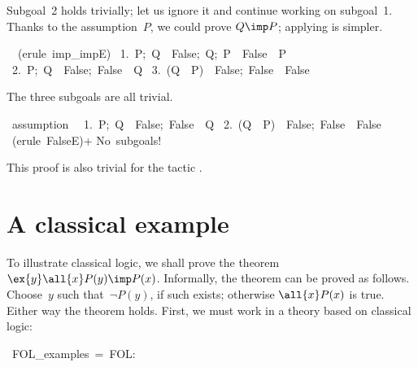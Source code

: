 Subgoal~2 holds trivially; let us ignore it and continue working on
subgoal~1.  Thanks to the assumption~$P$, we could prove $Q\imp P$;
applying  is simpler.
\begin{isabelle}
\ \ (erule\ imp\_impE)\isanewline
\ 1.\ \isasymlbrakk P;\ Q\ \isasymlongrightarrow \ False;\ Q;\ P\ \isasymlongrightarrow \ False\isasymrbrakk \ \isasymLongrightarrow \ P\isanewline
\ 2.\ \isasymlbrakk P;\ Q\ \isasymlongrightarrow \ False;\ False\isasymrbrakk \ \isasymLongrightarrow \ Q\isanewline
\ 3.\ \isasymlbrakk (Q\ \isasymlongrightarrow \ P)\ \isasymlongrightarrow \ False;\ False\isasymrbrakk \ \isasymLongrightarrow \ False%
\end{isabelle}
The three subgoals are all trivial.
\begin{isabelle}
\ assumption\ \isanewline
\ 1.\ \isasymlbrakk P;\ Q\ \isasymlongrightarrow \ False;\
False\isasymrbrakk \ \isasymLongrightarrow \ Q\isanewline
\ 2.\ \isasymlbrakk (Q\ \isasymlongrightarrow \ P)\
\isasymlongrightarrow \ False;\ False\isasymrbrakk \
\isasymLongrightarrow \ False%
\isanewline
\isacommand{apply}\ (erule\ FalseE)+\isanewline
No\ subgoals!\isanewline
{}
\end{isabelle}
This proof is also trivial for the \ML{} tactic .


\section{A classical example} \label{fol-cla-example}
To illustrate classical logic, we shall prove the theorem
$\ex{y}\all{x}P(y)\imp P(x)$.  Informally, the theorem can be proved as
follows.  Choose~$y$ such that~$\neg P(y)$, if such exists; otherwise
$\all{x}P(x)$ is true.  Either way the theorem holds.  First, we must
work in a theory based on classical logic:
\begin{isabelle}
\isacommand{theory}\ FOL\_examples\ =\ FOL:
\end{isabelle}

